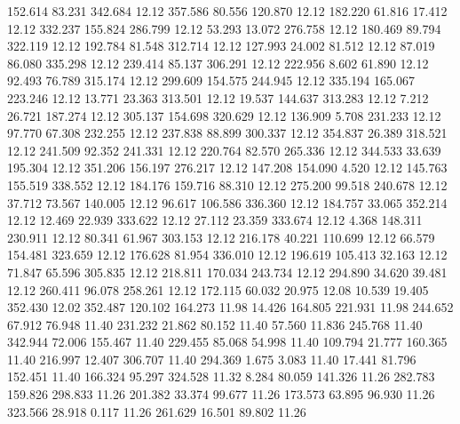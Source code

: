  152.614   83.231  342.684        12.12
 357.586   80.556  120.870        12.12
 182.220   61.816   17.412        12.12
 332.237  155.824  286.799        12.12
  53.293   13.072  276.758        12.12
 180.469   89.794  322.119        12.12
 192.784   81.548  312.714        12.12
 127.993   24.002   81.512        12.12
  87.019   86.080  335.298        12.12
 239.414   85.137  306.291        12.12
 222.956    8.602   61.890        12.12
  92.493   76.789  315.174        12.12
 299.609  154.575  244.945        12.12
 335.194  165.067  223.246        12.12
  13.771   23.363  313.501        12.12
  19.537  144.637  313.283        12.12
   7.212   26.721  187.274        12.12
 305.137  154.698  320.629        12.12
 136.909    5.708  231.233        12.12
  97.770   67.308  232.255        12.12
 237.838   88.899  300.337        12.12
 354.837   26.389  318.521        12.12
 241.509   92.352  241.331        12.12
 220.764   82.570  265.336        12.12
 344.533   33.639  195.304        12.12
 351.206  156.197  276.217        12.12
 147.208  154.090    4.520        12.12
 145.763  155.519  338.552        12.12
 184.176  159.716   88.310        12.12
 275.200   99.518  240.678        12.12
  37.712   73.567  140.005        12.12
  96.617  106.586  336.360        12.12
 184.757   33.065  352.214        12.12
  12.469   22.939  333.622        12.12
  27.112   23.359  333.674        12.12
   4.368  148.311  230.911        12.12
  80.341   61.967  303.153        12.12
 216.178   40.221  110.699        12.12
  66.579  154.481  323.659        12.12
 176.628   81.954  336.010        12.12
 196.619  105.413   32.163        12.12
  71.847   65.596  305.835        12.12
 218.811  170.034  243.734        12.12
 294.890   34.620   39.481        12.12
 260.411   96.078  258.261        12.12
 172.115   60.032   20.975        12.08
  10.539   19.405  352.430        12.02
 352.487  120.102  164.273        11.98
  14.426  164.805  221.931        11.98
 244.652   67.912   76.948        11.40
 231.232   21.862   80.152        11.40
  57.560   11.836  245.768        11.40
 342.944   72.006  155.467        11.40
 229.455   85.068   54.998        11.40
 109.794   21.777  160.365        11.40
 216.997   12.407  306.707        11.40
 294.369    1.675    3.083        11.40
  17.441   81.796  152.451        11.40
 166.324   95.297  324.528        11.32
   8.284   80.059  141.326        11.26
 282.783  159.826  298.833        11.26
 201.382   33.374   99.677        11.26
 173.573   63.895   96.930        11.26
 323.566   28.918    0.117        11.26
 261.629   16.501   89.802        11.26
